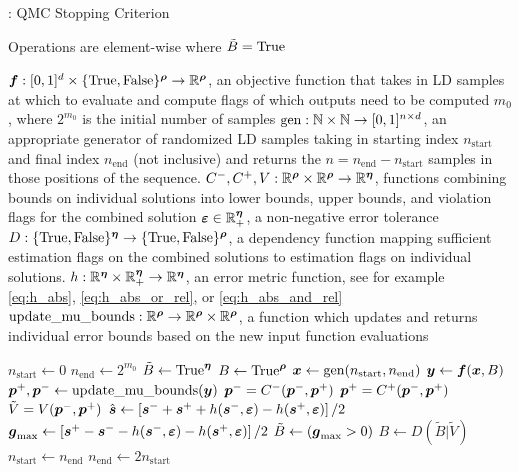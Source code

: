 \documentclass{article}[12pt]
\begin{document}
\begin{algorithm}
    \caption{: QMC Stopping Criterion}
    Operations are element-wise where $\tilde{B}=\text{True}$
    \label{algo:qmcsc}
    \begin{algorithmic}
    \Require $\boldsymbol{f}: [0,1]^d \times \{\text{True},\text{False}\}^{\boldsymbol{\rho}} \to \mathbb{R}^{\boldsymbol{\rho}}$, an objective function that takes in LD samples at which to evaluate and compute flags of which outputs need to be computed
    \Require $m_0$, where $2^{m_0}$ is the initial number of samples
    \Require $\text{gen}: \mathbb{N} \times \mathbb{N} \to [0,1]^{n \times d}$, an appropriate generator of randomized LD samples taking in starting index $n_\text{start}$ and final index $n_\text{end}$ (not inclusive) and returns the $n = n_\text{end} - n_\text{start}$ samples in those positions of the sequence. 
    \Require $C^-,C^+,V: \mathbb{R}^{\boldsymbol{\rho}} \times \mathbb{R}^{\boldsymbol{\rho}} \to \mathbb{R}^{\boldsymbol{\eta}}$, functions combining bounds on individual solutions into lower bounds, upper bounds, and violation flags for the combined solution
    \Require $\boldsymbol{\varepsilon} \in \mathbb{R}_+^{\boldsymbol{\eta}}$, a non-negative error tolerance 
    \Require $D: \{\text{True},\text{False}\}^{\boldsymbol{\eta}} \to \{\text{True},\text{False}\}^{\boldsymbol{\rho}}$, a dependency function mapping sufficient estimation flags on the combined solutions to estimation flags on individual solutions. 
    \Require $h: \mathbb{R}^{\boldsymbol{\eta}} \times \mathbb{R}^{\boldsymbol{\eta}}_+ \to \mathbb{R}^{\boldsymbol{\eta}}$, an error metric function, see for example \eqref{eq:h_abs}, \eqref{eq:h_abs_or_rel}, or \eqref{eq:h_abs_and_rel}
    \Require $\text{update\_mu\_bounds}: \mathbb{R}^{\boldsymbol{\rho}} \to \mathbb{R}^{\boldsymbol{\rho}} \times \mathbb{R}^{\boldsymbol{\rho}}$, a function which updates and returns individual error bounds based on the new input function evaluations
    
    \hrulefill
    
    \State $n_\text{start} \gets 0$
    \State $n_\text{end} \gets 2^{m_0}$
    \State $\tilde{B} \gets \text{True}^{\boldsymbol{\eta}}$
    \State $B \gets \text{True}^{\boldsymbol{\rho}}$
        \State $\boldsymbol{x} \gets \text{gen}(n_\text{start},n_\text{end})$
        \State $\boldsymbol{y} \gets \boldsymbol{f}(\boldsymbol{x},B)$
        \State $\boldsymbol{p}^+,\boldsymbol{p}^- \gets \text{update\_mu\_bounds}(\boldsymbol{y})$
        \State $\boldsymbol{p}^- = C^-(\boldsymbol{p}^-,\boldsymbol{p}^+)$
        \State $\boldsymbol{p}^+ = C^+(\boldsymbol{p}^-,\boldsymbol{p}^+)$
        \State $\tilde{V} = V(\boldsymbol{p}^-,\boldsymbol{p}^+)$
        \State $\hat{\boldsymbol{s}} \gets \left[\boldsymbol{s}^-+\boldsymbol{s}^++h(\boldsymbol{s}^-,\boldsymbol{\varepsilon})-h(\boldsymbol{s}^+,\boldsymbol{\varepsilon})\right]/2$
        \State $\boldsymbol{g}_\text{max} \gets \left[\boldsymbol{s}^+-\boldsymbol{s}^--h(\boldsymbol{s}^-,\boldsymbol{\varepsilon})-h(\boldsymbol{s}^+,\boldsymbol{\varepsilon})\right]/2$
        \State $\tilde{B} \gets \left(\boldsymbol{g}_\text{max}>0\right)$
        \State $B \gets D(\tilde{B} | \tilde{V})$
        \State $n_\text{start} \gets n_\text{end}$
        \State $n_\text{end} \gets 2n_\text{start}$
    \EndWhile
    \end{algorithmic}
\end{algorithm}
\end{document}
